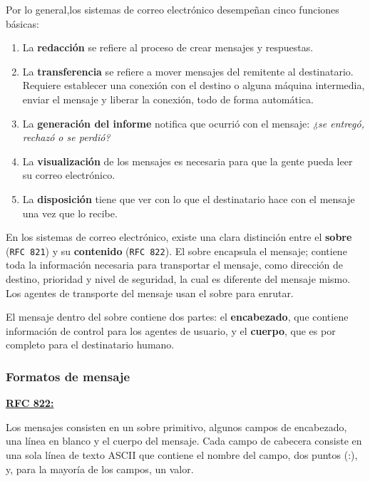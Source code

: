 \documentclass[10pt,a4paper]{article}
\begin{document}
Por lo general,los sistemas de correo electrónico desempeñan cinco funciones básicas:

\begin{enumerate}
\item La \textbf{redacción} se refiere al proceso de crear mensajes y respuestas. 
\item La \textbf{transferencia} se refiere a mover mensajes del remitente al destinatario. Requiere establecer una conexión con el destino o alguna máquina intermedia, enviar el mensaje y liberar la conexión, todo de forma automática.
\item La \textbf{generación del informe} notifica que ocurrió con el mensaje: \textit{¿se entregó, rechazó o se perdió?}
\item La \textbf{visualización} de los mensajes es necesaria para que la gente pueda leer su correo electrónico. 
\item La \textbf{disposición} tiene que ver con lo que el destinatario hace con el mensaje una vez que lo recibe.
\end{enumerate}

En los sistemas de correo electrónico, existe una clara distinción entre el \textbf{sobre} (\texttt{RFC 821}) y su \textbf{contenido} (\texttt{RFC 822}). El sobre encapsula el mensaje; contiene toda la información necesaria para transportar el mensaje, como dirección de destino, prioridad y nivel de seguridad, la cual es diferente del mensaje mismo. Los agentes de transporte del mensaje usan el sobre para enrutar.

El mensaje dentro del sobre contiene dos partes: el \textbf{encabezado}, que contiene información de control para los agentes de usuario, y el \textbf{cuerpo}, que es por completo para el destinatario humano.

\subsubsection{Formatos de mensaje}

\underline{\textbf{RFC 822:}}

Los mensajes consisten en un sobre primitivo, algunos campos de encabezado, una línea en blanco y el cuerpo del mensaje. Cada campo de cabecera consiste en una sola línea de
texto ASCII que contiene el nombre del campo, dos puntos (:), y, para la mayoría de los campos, un valor.
\end{document}
